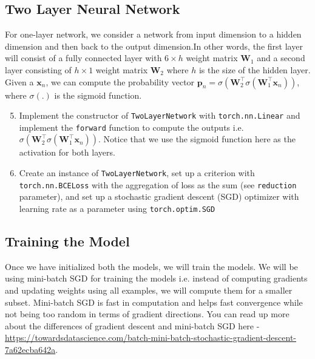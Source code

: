 \subsection{Two Layer Neural Network }

For one-layer network, we consider a network from input dimension to a hidden dimension and then back to the output dimension.In other words, the first layer will consist of a fully connected layer with $6 \times h$ weight matrix $\mathbf{W}_1$ and a second layer consisting of $h \times 1$ weight matrix $\mathbf{W}_2$ where $h$ is the size of the hidden layer. Given a $\mathbf{x}_n$, we can compute the probability vector $\mathbf{p}_n = \sigma(\mathbf{W}_2^\top \sigma(\mathbf{W}_1^\top \mathbf{x}_n))$, where $\sigma(.)$ is the sigmoid function.

\begin{enumerate}
\setcounter{enumi}{4}

\item {}
Implement the constructor of \verb|TwoLayerNetwork| with \verb|torch.nn.Linear| and implement the \verb|forward| function to compute the outputs i.e. $\sigma(\mathbf{W}_2^\top \sigma(\mathbf{W}_1^\top \mathbf{x}_n))$. Notice that we use the sigmoid function here as the activation for both layers.

\item {}
Create an instance of \verb|TwoLayerNetwork|, set up a criterion with \verb|torch.nn.BCELoss| with the aggregation of loss as the sum (see \verb|reduction| parameter), and set up a stochastic gradient descent (SGD) optimizer with learning rate as a parameter using \verb|torch.optim.SGD| 

\end{enumerate}

\subsection{Training the Model }

Once we have initialized both the models, we will train the models. We will be using mini-batch SGD for training the models i.e. instead of computing gradients and updating weights using all examples, we will compute them for a smaller subset. Mini-batch SGD is fast in computation and helps fast convergence while not being too random in terms of gradient directions. You can read up more about the differences of gradient descent and mini-batch SGD here - \url{https://towardsdatascience.com/batch-mini-batch-stochastic-gradient-descent-7a62ecba642a}.

